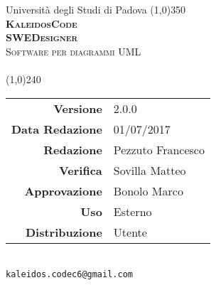 \documentclass[a4paper,12pt]{article}
\author{KaleidosCode}
\date{01/07/2017}	%
\begin{document}
	\begin{titlepage}		
		\centering Università degli Studi di Padova
		\line(1,0){350}\\
		\vspace{0.4cm}
		{\bfseries\scshape\LARGE KaleidosCode\\}
		\vspace{0.4cm}
		{\bfseries\scshape\LARGE SWEDesigner\\}
		{\scshape\Large Software per diagrammi UML\\}
		\vspace{1cm}
		{\scshape\Large \manualeutentei\ \\}		%
		\vspace{1.4cm}
		\logo
		\vspace{1.2cm}
		\line(1,0){240}\\
		\begin{tabular}{r|l}
			{\hfill \textbf{Versione}} 			& 2.0.0\\
			{\hfill \textbf{Data Redazione}} 	& 01/07/2017\\	%
			{\hfill \textbf{Redazione}} 		& Pezzuto Francesco\\
			{\hfill \textbf{Verifica}} 			& Sovilla Matteo\\
			{\hfill \textbf{Approvazione}} 		& Bonolo Marco\\
			{\hfill \textbf{Uso}} 				& Esterno\\
			{\hfill \textbf{Distribuzione}} 	& Utente\\
		\end{tabular}\\
		\vspace{2cm}
		\texttt{kaleidos.codec6@gmail.com}
	\end{titlepage}

	\pagestyle{myfront}
	\newpage
		
	\newpage
		\tableofcontents
	\newpage
		\listoffigures
	\newpage
	\pagestyle{mymain}
		
	\newpage
		
	\newpage
		
	\newpage
		
	\appendix
	\newpage
		
	\label{LastPage}
\end{document}
